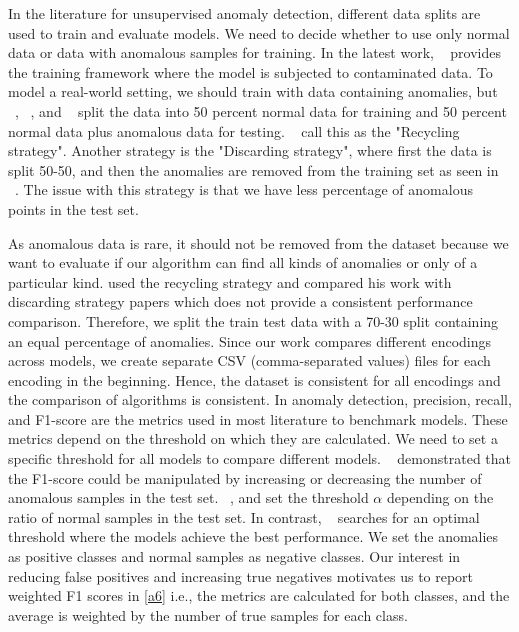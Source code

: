 \documentclass{article}
\begin{document}
In the literature for unsupervised anomaly detection, different data splits are used to train and evaluate models. We need to decide whether to use only normal data or data with anomalous samples for training. In the latest work, ~\citep{qiu2022latent} provides the training framework where the model is subjected to contaminated data. To model a real-world setting, we should train with data containing anomalies, but ~\citep{dagmm}, ~\citep{zenati}, and ~\citep{bergman} split the data into 50 percent normal data for training and 50 percent normal data plus anomalous data for testing. ~\citep{recent2022}  call this as the "Recycling strategy". Another strategy is the "Discarding strategy", where first the data is split 50-50, and then the anomalies are removed from the training set as seen in  ~\citep{zhai2016deep}. The issue with this strategy is that we have less percentage of anomalous points in the test set.

As anomalous data is rare, it should not be removed from the dataset because we want to evaluate if our algorithm can find all kinds of anomalies or only of a particular kind. \citep{zenati} used the recycling strategy and compared his work with discarding strategy papers which does not provide a consistent performance comparison. Therefore, we split the train test data with a 70-30 split containing an equal percentage of anomalies. Since our work compares different encodings across models, we create separate CSV (comma-separated values) files for each encoding in the beginning. Hence, the dataset is consistent for all encodings and the comparison of algorithms is consistent. In anomaly detection, precision, recall, and F1-score are the metrics used in most literature to benchmark models. These metrics depend on the threshold on which they are calculated. We need to set a specific threshold for all models to compare different models. ~\citep{fourure2021anomaly} demonstrated that the F1-score could be manipulated by increasing or decreasing the number of anomalous samples in the test set. ~\citep{dagmm}, \citep{zenati} and\citep{bergman} set the threshold $\alpha$ depending on the ratio of normal samples in the test set. In contrast, ~\citep{qiu2021neural} searches for an optimal threshold where the models achieve the best performance. We set the anomalies as positive classes and normal samples as negative classes. Our interest in reducing false positives and increasing true negatives motivates us to report weighted F1 scores in \ref{a6} i.e., the metrics are calculated for both classes, and the average is weighted by the number of true samples for each class.
\end{document}
